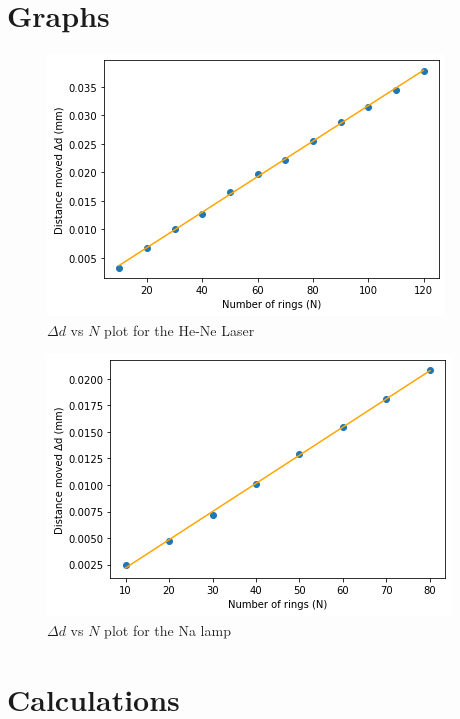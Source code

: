 \documentclass{article}
\begin{document}
\section{Graphs}
\begin{figure}[h!]
    \centering
    \includegraphics[scale = 0.75]{Figures/laserPlot.png}
    \caption{$\Delta d$ vs $N$ plot for the He-Ne Laser}
    \label{fig:laserplot}
\end{figure}
\begin{figure}[h!]
    \centering
    \includegraphics[scale = 0.75]{Figures/lampPlot.png}
    \caption{$\Delta d$ vs $N$ plot for the Na lamp}
    \label{fig:lampplot}
\end{figure}
\section{Calculations}
\end{document}
